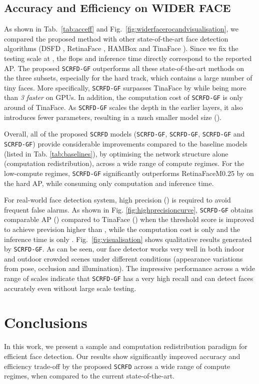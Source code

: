 \documentclass[10pt,twocolumn,letterpaper]{article}
\newcommand{\dsname}[1]{\texttt{\small #1}\xspace}
\newcommand{\scrfd}{\dsname{SCRFD}}
\newcommand{\scrfdf}[1]{\dsname{SCRFD-\text{#1}GF}}
\begin{document}
\subsection{Accuracy and Efficiency on WIDER FACE}
As shown in Tab.~\ref{tab:acceff} and Fig.~\ref{fig:widerfacerocandvisualisation}, we compared the proposed method with other state-of-the-art face detection algorithms (\eg DSFD \cite{li2019dsfd}, RetinaFace \cite{deng2019retinaface}, HAMBox \cite{liu2019hambox} and TinaFace \cite{zhu2020tinaface}). Since we fix the testing scale at , the flops and inference time directly correspond to the reported AP. The proposed \scrfdf{34} outperforms all these state-of-the-art methods on the three subsets, especially for the hard track, which contains a large number of tiny faces. More specifically, \scrfdf{34} surpasses TinaFace by  while being more than \emph{3 faster} on GPUs. In addition, the computation cost of \scrfdf{34} is only around  of TinaFace. As \scrfdf{34} scales the depth in the earlier layers, it also introduces fewer parameters, resulting in a much smaller model size (). 

Overall, all of the proposed \scrfd models (\eg \scrfdf{34}, \scrfdf{10}, \scrfdf{2.5} and \scrfdf{0.5}) provide considerable improvements compared to the baseline models (listed in Tab. \ref{tab:baselines}), by optimising the network structure alone (\ie computation redistribution), across a wide range of compute regimes. For the low-compute regimes, \scrfdf{0.5} significantly outperforms RetinaFaceM0.25 by  on the hard AP, while consuming only  computation and  inference time. 

For real-world face detection system, high precision (\eg ) is required to avoid frequent false alarms. As shown in Fig. \ref{fig:highprecisioncurve},
\scrfdf{2.5} obtains comparable AP () compared to TinaFace () when the threshold score is improved to achieve prevision higher than , while the computation cost is only  and the inference time is only . Fig.~\ref{fig:visualisation} shows qualitative results generated by \scrfdf{2.5}. As can be seen, our face detector works very well in both indoor and outdoor crowded scenes under different conditions (\eg appearance variations from pose, occlusion and illumination). The impressive performance across a wide range of scales indicate that \scrfdf{2.5} has a very high recall and can detect faces accurately even without large scale testing.

\section{Conclusions}

In this work, we present a sample and computation redistribution paradigm for efficient face detection. Our results show significantly improved accuracy and efficiency trade-off by the proposed \scrfd across a wide range of compute regimes, when compared to the current state-of-the-art.

{\small


}
\end{document}
